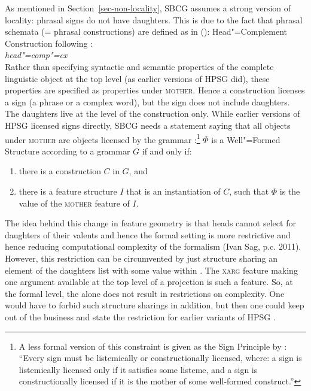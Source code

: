 \documentclass[output=paper,biblatex,babelshorthands,newtxmath,draftmode,colorlinks,citecolor=brown]{langscibook}
\begin{document}
As mentioned in Section~\ref{sec-non-locality}, SBCG assumes a strong version of locality: phrasal
signs do not have daughters. This is due to the fact that phrasal schemata (= phrasal constructions)
are defined as in ():
\eas
Head"=Complement Construction following \citet[481]{SWB2003a}:\\
\emph{head"=comp"=cx} \impl\\
\zs
Rather than specifying syntactic and semantic properties of the complete linguistic object at the
top level (as earlier versions of HPSG did), these properties are specified as properties under \textsc{mother}. Hence a construction
licenses a sign (a phrase or a complex word), but the sign does not include daughters. The daughters live at the level of the
construction only. While earlier versions of HPSG licensed signs directly, SBCG needs a statement
saying that all objects under \textsc{mother} are objects licensed by the grammar \citep*[]{SWB2003a}:\footnote{%
A less formal version of this constraint is given as the Sign Principle by
\citet[]{Sag2012a}: ``Every sign must be listemically or constructionally licensed, where: a
sign is listemically licensed only if it satisfies some listeme, and a sign is constructionally
licensed if it is the mother of some well-formed construct.''
}
\ea
\label{meta-construction-statemnet}
$\Phi$ is a Well"=Formed Structure according to a grammar $G$ if and only if:
\begin{enumerate}
\item there is a construction $C$ in $G$, and
\item there is a feature structure $I$ that is an instantiation of $C$, such that
      $\Phi$ is the value of the \textsc{mother} feature of $I$.
\end{enumerate}
\z
The idea behind this change in feature geometry is that heads cannot select for daughters of their valents and hence
the formal setting is more restrictive and hence reducing computational complexity of the formalism (Ivan Sag,
p.c. 2011). However, this restriction can be circumvented by just structure sharing an element of
the daughters list with some value within \mother. The \textsc{xarg} feature making one argument
available at the top level of a projection \citep{BF99a} is such a feature. So, at the formal level, the \motherf alone does not
result in restrictions on complexity. One would have to forbid such structure sharings in addition,
but then one could keep \mother out of the business and state the restriction for earlier variants
of HPSG \citep[Section~10.6.2.1.3]{MuellerGT-Eng2}.
\end{document}
